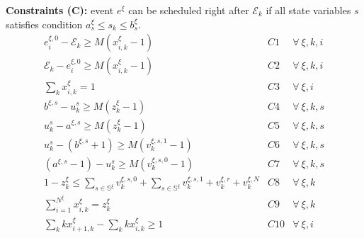 \documentclass[]{interact}
\theoremstyle{plain}%
\theoremstyle{definition}
\theoremstyle{remark}
\begin{document}
\textbf{Constraints (C):} event $e^{\xi}$ can be scheduled right after $\mathcal{E}_k$ if all state variables $s$ satisfies condition $a^{\xi}_{s}\le s_k\le b^{\xi}_{s}$. 
\begin{eqnarray}
e^{\xi,0}_i-\mathcal{E}_{k} \ge M(x^{\xi}_{i,k}-1)&C1& \forall\ \xi,k,i\\
\mathcal{E}_{k} -e^{\xi,0}_i\ge M(x^{\xi}_{i,k}-1)&C2& \forall\ \xi,k,i\\
\sum_{k} x^{\xi}_{i,k} =1&C3& \forall\ \xi,i\\
b^{\xi,s} - u^s_k \ge M(z^{\xi}_{k}-1)&C4& \forall\ \xi, k,s\\
 u^s_k - a^{\xi,s} \ge M(z^{\xi}_{k}-1)&C5& \forall\ \xi, k,s\\
u^s_k -  (b^{\xi,s}+1) \ge M(v^{\xi,s,1}_k-1) &C6& \forall\ \xi,k,s\\
( a^{\xi,s}-1) - u^s_k \ge M(v^{\xi,s,0}_k-1) &C7& \forall\ \xi,k,s\\
1 - z^{\xi}_{k} \le \sum_{s\in \mathbb{S}^{\xi}} v^{\xi,s,0}_k + \sum_{s\in \mathbb{S}^{\xi}} v^{\xi,s,1}_k + v^{\xi,r}_k + v^{\xi,N}_k&C8&\forall\ \xi,k\\
\sum_{i=1}^{N^{\xi}}x^{\xi}_{i,k} = z^{\xi}_k&C9&\forall\ \xi,k\\
\sum_{k} kx^{\xi}_{i+1,k} - \sum_{k} kx^{\xi}_{i,k} \ge 1&C10& \forall\ \xi,i
\end{eqnarray}

\end{document}
